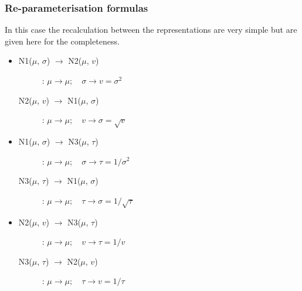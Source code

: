 {\subsubsection{Re-parameterisation formulas}
In this case the recalculation between the representations are very simple
but are given here for the completeness.
\begin{itemize}
\item 
\begin{description}
\item[N1($\mu$, $\sigma$) $\rightarrow$ N2($\mu$, $v$)]:
$\mu \rightarrow \mu; \quad \sigma \rightarrow v=\sigma^2$

\item[N2($\mu$, $v$) $\rightarrow$ N1($\mu$, $\sigma$)]:
$\mu \rightarrow \mu; \quad v \rightarrow \sigma = \sqrt{v}$
\end{description}

\item 
\begin{description}
\item[N1($\mu$, $\sigma$) $\rightarrow$ N3($\mu$, $\tau$)]:
$\mu \rightarrow \mu; \quad \sigma \rightarrow \tau=1/\sigma^2$

\item[N3($\mu$, $\tau$) $\rightarrow$ N1($\mu$, $\sigma$)]:
$\mu \rightarrow \mu; \quad \tau \rightarrow \sigma=1/\sqrt{\tau}$
\end{description}

\item 
\begin{description}
\item[N2($\mu$, $v$) $\rightarrow$ N3($\mu$, $\tau$)]:
$\mu \rightarrow \mu; \quad v \rightarrow \tau=1/v$

\item[N3($\mu$, $\tau$) $\rightarrow$ N2($\mu$, $v$)]:
$\mu \rightarrow \mu; \quad \tau \rightarrow v=1/\tau$
\end{description}
\end{itemize}

}
